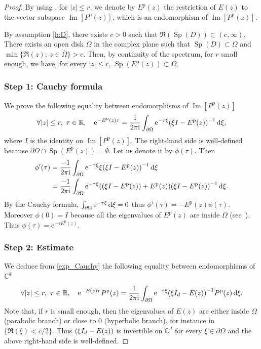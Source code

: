 \documentclass[10pt]{amsart}
\theoremstyle{plain}
\theoremstyle{definition}
\theoremstyle{remark}
\DeclareMathOperator{\Sp}{Sp}
\DeclareMathOperator{\Ima}{Im}
\newcommand{\diff}[1][-3]{\ensuremath{\mathop{}\mkern#1mu\mathrm{d}}}
\newcommand{\set}{\mathbb}
\newcommand{\R}{} %
\renewcommand{\R}{\set{R}}
\renewcommand{\C}{\set{C}}
\newcommand{\p}{{\mathrm p}}
\newcommand{\eu}{\mathrm e}
\newcommand{\iu}{\mathrm i}
\let\originalleft\left
\let\originalright\right
\renewcommand{\left}{\mathopen{}\mathclose\bgroup\originalleft}
\renewcommand{\right}{\aftergroup\egroup\originalright}
\begin{document}
\begin{proof}
By using , for $|z| \leq r$, we denote by $E^\p(z)$ the restriction of $E(z)$ to the vector subspace $\Ima[P^\p(z)]$, which is an endomorphism of $\Ima[P^\p(z)]$.

By assumption \eqref{h:D}, there exists $c>0$ such that $\Re(\Sp(D)) \subset (c, \infty)$.
There exists an open disk $\Omega$ in the complex plane such that $\Sp(D) \subset \Omega$ and $\min\{ \Re(z);\ z\in \overline{\Omega} \} >c$. Then, by continuity of the spectrum, for $r$ small enough, we have, for every $|z|\leq r$, $\Sp(E^\p(z)) \subset \Omega$.

\subsubsection*{Step 1: Cauchy formula}
We prove the following equality between endomorphisms of $\Ima[P^\p(z)]$
\begin{equation} \label{exp_Cauchy}
\forall |z|\leq r,\ \tau \in \R, \quad
\eu^{ -E^\p (z)\tau}=\frac{1}{2\pi \iu } \int_{\partial\Omega} \eu^{-\tau \xi} \left(\xi I - E^\p(z) \right)^{-1} \diff\xi,
\end{equation}
where $I$ is the identity on $\Ima[P^\p(z)]$.
The right-hand side is well-defined because $\partial\Omega \cap\Sp(E^\p(z)) = \emptyset$. Let us denote it by $\phi(\tau)$.
Then
\begin{align*}
\phi'(\tau) & =\frac{-1}{2\pi \iu } \int_{\partial\Omega} \eu^{-\tau \xi} \xi \left(\xi I - E^\p(z) \right)^{-1} \diff\xi
\\ & = \frac{-1}{2\pi \iu } \int_{\partial\Omega} \eu^{-\tau \xi} \left((\xi I - E^\p(z))+E^\p(z) \right) \left(\xi I - E^\p(z) \right)^{-1} \diff\xi.
\end{align*}
By the Cauchy formula, $\int_{\partial\Omega} \eu^{-\tau \xi} \diff\xi=0$ thus
$\phi'(\tau)=-E^\p(z)\phi(\tau)$. Moreover $\phi(0)=I$ because all the eigenvalues of $E^\p(z)$ are inside $\Omega$ (see~\cite[Ch.\,I, Prob.\,5.9]{kato_1995}). Thus $\phi(\tau)=\eu^{-\tau E^\p(z)}$.

\subsubsection*{Step 2: Estimate}
We deduce from \eqref{exp_Cauchy} the following equality between endomorphisms of $\C^d$
\begin{equation} \label{exp_Cauchy_Pp}
\forall |z|\leq r,\ \tau \in \R, \quad
\eu^{ - E (z)\tau} P^\p(z) =\frac{1}{2\pi \iu } \int_{\partial\Omega} \eu^{-\tau \xi} \left(\xi I_d - E(z) \right)^{-1} P^\p(z) \diff\xi.
\end{equation}
Note that, if $r$ is small enough, then the eigenvalues of $E(z)$ are either inside $\Omega$ (parabolic branch) or close to $0$ (hyperbolic branch), for instance in $\{ \Re(\xi) < c/2 \}$. Thus $\left(\xi I_d - E(z) \right)$ is invertible on $\C^d$ for every $\xi \in \partial\Omega$ and the above right-hand side is well-defined.


\end{proof}
\end{document}
